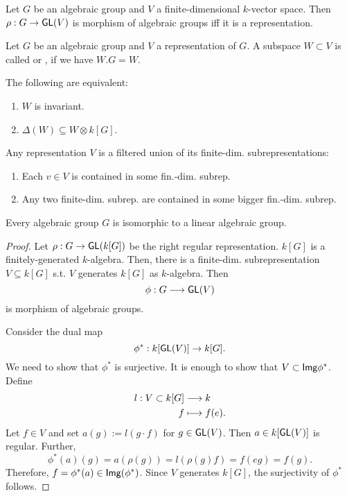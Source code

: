 \begin{lemma}
	Let $G$ be an algebraic group and $V$ a finite-dimensional $k$-vector space. Then $\rho : G \overset{}{\rightarrow} \textsf{GL}(V)$ is morphism of algebraic groups iff it is a representation.
\end{lemma}

\begin{definition}
Let $G$ be an algebraic group and $V$ a representation of $G$. A subspace $W \subset V$ is called  or , if we have $W.G = W$.
\end{definition}
\begin{lemma}
	The following are equivalent:
	\begin{enumerate}
		\item $W$ is invariant.
		\item $\Delta(W) \subseteq W \otimes k[G]$.
	\end{enumerate}
\end{lemma}

\begin{lemma}
	Any representation $V$ is a filtered union of its finite-dim. subrepresentations:
	\begin{enumerate}
		\item Each $v \in V$ is contained in some fin.-dim. subrep.
		\item Any two finite-dim. subrep. are contained in some bigger fin.-dim. subrep.
	\end{enumerate}
\end{lemma}

\begin{theorem}
	Every algebraic group $G$ is isomorphic to a linear algebraic group.
\end{theorem}
\begin{proof}
	Let $\rho : G \overset{}{\rightarrow} \textsf{GL}(k[G])$ be the right regular representation. $k[G]$ is a finitely-generated $k$-algebra. Then, there is a finite-dim. subrepresentation $V \subseteq k[G]$ s.t. $V$ generates $k[G]$ as $k$-algebra. Then
	\[\phi: G \overset{}{\longrightarrow} \textsf{GL}(V) \]
	 is morphism of algebraic groups.
	 
	 Consider the dual map
	 \[ \phi^* : k[\textsf{GL}(V)] \overset{}{\rightarrow} k[G]. \]
	 We need to show that $\phi^*$ is surjective. It is enough to show that $V \subset \textsf{Img} \phi^*$. Define
	 \begin{align*}
	 l : V \subset k[G] & \overset{}{\longrightarrow} k\\
	 f &\longmapsto f(e).
	 \end{align*}
	 Let $f \in V$ and set $a(g) := l(g\cdot f)$ for $g \in \textsf{GL}(V)$. Then $a \in k[\textsf{GL}(V)]$ is regular. Further,
	 \[ \phi^*(a)(g) = a(\rho(g)) = l(\rho(g)f) = f(eg) = f(g). \]
	 Therefore, $f = \phi^*(a) \in \textsf{Img}(\phi^*)$. Since $V$ generates $k[G]$, the surjectivity of $\phi^*$ follows.
\end{proof}

